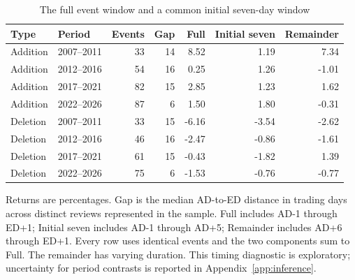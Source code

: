 \begin{table}[!htbp]
\centering
\caption{The full event window and a common initial seven-day window}\label{tab:timing}
\small
\setlength{\tabcolsep}{5pt}
\begin{tabular}{llrrrrr}
\toprule
Type & Period & Events & Gap & Full & Initial seven & Remainder \\
\midrule
Addition & 2007--2011 & 33 & 14 & 8.52 & 1.19 & 7.34 \\
Addition & 2012--2016 & 54 & 16 & 0.25 & 1.26 & -1.01 \\
Addition & 2017--2021 & 82 & 15 & 2.85 & 1.23 & 1.62 \\
Addition & 2022--2026 & 87 & 6 & 1.50 & 1.80 & -0.31 \\
Deletion & 2007--2011 & 33 & 15 & -6.16 & -3.54 & -2.62 \\
Deletion & 2012--2016 & 46 & 16 & -2.47 & -0.86 & -1.61 \\
Deletion & 2017--2021 & 61 & 15 & -0.43 & -1.82 & 1.39 \\
Deletion & 2022--2026 & 75 & 6 & -1.53 & -0.76 & -0.77 \\
\bottomrule
\end{tabular}
\begin{minipage}{\linewidth}\footnotesize\vspace{5pt}
Returns are percentages. Gap is the median AD-to-ED distance in trading days across distinct reviews represented in the sample. Full includes AD-1 through ED+1; Initial seven includes AD-1 through AD+5; Remainder includes AD+6 through ED+1. Every row uses identical events and the two components sum to Full. The remainder has varying duration. This timing diagnostic is exploratory; uncertainty for period contrasts is reported in Appendix~\ref{app:inference}.
\end{minipage}
\end{table}
